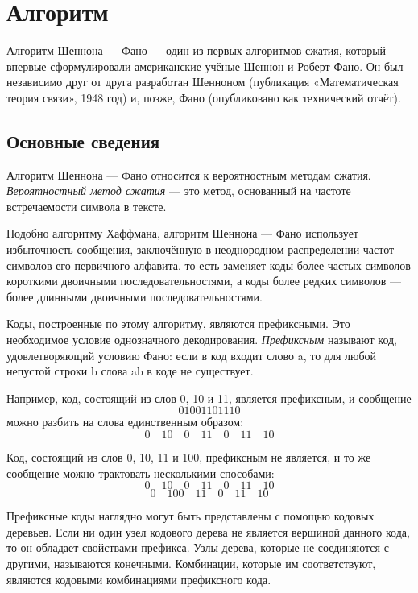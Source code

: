 \documentclass{article}
\begin{document}
\newpage
\section{Алгоритм}
Алгоритм Шеннона --- Фано --- один из первых алгоритмов сжатия, который впервые сформулировали 
американские учёные Шеннон и Роберт Фано. Он был независимо друг от друга разработан Шенноном 
(публикация «Математическая теория связи», 1948 год) и, позже, Фано (опубликовано как технический отчёт).\cite{wiki}

\subsection{Основные сведения}

Алгоритм Шеннона --- Фано относится к вероятностным методам сжатия. 
\textit{Вероятностный метод сжатия} --- это метод, основанный на частоте встречаемости символа в тексте.

Подобно алгоритму Хаффмана, алгоритм Шеннона — Фано использует избыточность сообщения, 
заключённую в неоднородном распределении частот символов его первичного алфавита, 
то есть заменяет коды более частых символов короткими двоичными последовательностями, 
а коды более редких символов --- более длинными двоичными последовательностями. 

Коды, построенные по этому алгоритму, являются префиксными. Это необходимое условие 
однозначного декодирования. \textit{Префиксным} называют код, удовлетворяющий условию Фано: 
если в код входит слово a, то для любой непустой строки b слова ab в коде не существует.

Например, код, состоящий из слов 0, 10 и 11, является префиксным, и сообщение
$$
01001101110
$$
можно разбить на слова единственным образом:
$$
0\quad10\quad0\quad11\quad0\quad11\quad10
$$

Код, состоящий из слов 0, 10, 11 и 100, префиксным не является, и то же 
сообщение можно трактовать несколькими способами:
$$
0\quad10\quad0\quad11\quad0\quad11\quad10
$$$$
0\quad100\quad11\quad0\quad11\quad10
$$

Префиксные коды наглядно могут быть представлены с помощью кодовых деревьев. 
Если ни один узел кодового дерева не является вершиной данного кода, то он обладает 
свойствами префикса. Узлы дерева, которые не соединяются с другими, называются конечными. 
Комбинации, которые им соответствуют, являются кодовыми комбинациями префиксного кода.

\newpage
\end{document}
